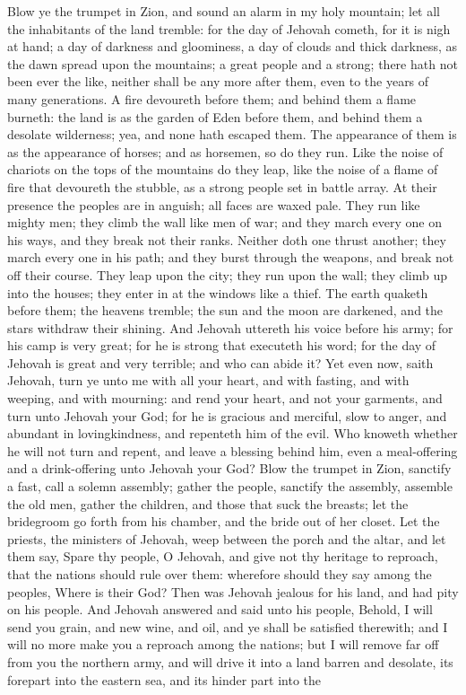 Blow ye the trumpet in Zion, and sound an alarm in my holy mountain; let all the inhabitants of the land tremble: for the day of Jehovah cometh, for it is nigh at hand; a day of darkness and gloominess, a day of clouds and thick darkness, as the dawn spread upon the mountains; a great people and a strong; there hath not been ever the like, neither shall be any more after them, even to the years of many generations. A fire devoureth before them; and behind them a flame burneth: the land is as the garden of Eden before them, and behind them a desolate wilderness; yea, and none hath escaped them.  The appearance of them is as the appearance of horses; and as horsemen, so do they run. Like the noise of chariots on the tops of the mountains do they leap, like the noise of a flame of fire that devoureth the stubble, as a strong people set in battle array. At their presence the peoples are in anguish; all faces are waxed pale. They run like mighty men; they climb the wall like men of war; and they march every one on his ways, and they break not their ranks. Neither doth one thrust another; they march every one in his path; and they burst through the weapons, and break not off their course. They leap upon the city; they run upon the wall; they climb up into the houses; they enter in at the windows like a thief. The earth quaketh before them; the heavens tremble; the sun and the moon are darkened, and the stars withdraw their shining. And Jehovah uttereth his voice before his army; for his camp is very great; for he is strong that executeth his word; for the day of Jehovah is great and very terrible; and who can abide it?  Yet even now, saith Jehovah, turn ye unto me with all your heart, and with fasting, and with weeping, and with mourning: and rend your heart, and not your garments, and turn unto Jehovah your God; for he is gracious and merciful, slow to anger, and abundant in lovingkindness, and repenteth him of the evil. Who knoweth whether he will not turn and repent, and leave a blessing behind him, even a meal-offering and a drink-offering unto Jehovah your God?  Blow the trumpet in Zion, sanctify a fast, call a solemn assembly; gather the people, sanctify the assembly, assemble the old men, gather the children, and those that suck the breasts; let the bridegroom go forth from his chamber, and the bride out of her closet. Let the priests, the ministers of Jehovah, weep between the porch and the altar, and let them say, Spare thy people, O Jehovah, and give not thy heritage to reproach, that the nations should rule over them: wherefore should they say among the peoples, Where is their God?  Then was Jehovah jealous for his land, and had pity on his people. And Jehovah answered and said unto his people, Behold, I will send you grain, and new wine, and oil, and ye shall be satisfied therewith; and I will no more make you a reproach among the nations; but I will remove far off from you the northern army, and will drive it into a land barren and desolate, its forepart into the eastern sea, and its hinder part into the 